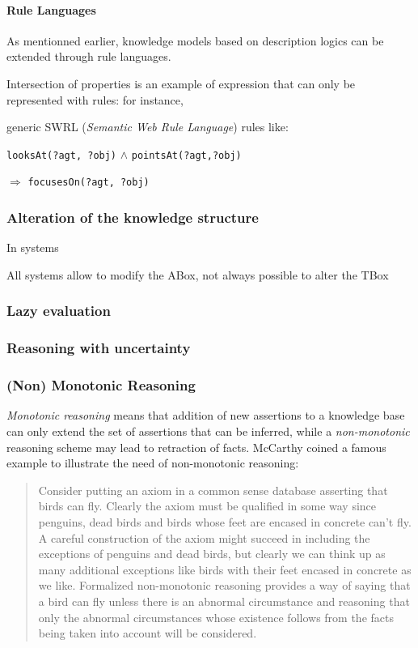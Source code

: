 \documentclass[a4paper, twocolumn]{article}
\newcommand{\concept}[1]{{\footnotesize \texttt{#1}}}
\begin{document}
\paragraph{Rule Languages}

As mentionned earlier, knowledge models based on description logics can be extended through rule languages.

Intersection of properties is an example of expression that can only be represented with rules: for instance, 

generic SWRL ({\em Semantic Web Rule Language}) rules like: \par
        \footnotesize \concept{looksAt(?agt, ?obj)} $\land$
        \concept{pointsAt(?agt,?obj)} \par $\Rightarrow$ \concept{focusesOn(?agt, ?obj)}
        \normalsize 


\subsubsection{Alteration of the knowledge structure}

In systems

All systems allow to modify the ABox, not always possible to alter the TBox


\subsubsection{Lazy evaluation}
\label{sect|lazy-evaluation}


\subsubsection{Reasoning with uncertainty}


\subsubsection{(Non) Monotonic Reasoning}

\emph{Monotonic reasoning} means that addition of new assertions to a knowledge base
can only extend the set of assertions that can be inferred, while a
\emph{non-monotonic} reasoning scheme may lead to retraction of facts.
McCarthy coined a famous example to illustrate the need of non-monotonic reasoning:

\begin{quotation}
Consider putting an axiom in a common sense database asserting that birds can
fly. Clearly the axiom must be qualified in some way since penguins, dead birds
and birds whose feet are encased in concrete can't fly. A careful construction
of the axiom might succeed in including the exceptions of penguins and dead
birds, but clearly we can think up as many additional exceptions like birds
with their feet encased in concrete as we like. Formalized non-monotonic
reasoning provides a way of saying that a bird can fly unless there
is an abnormal circumstance and reasoning that only the abnormal circumstances
whose existence follows from the facts being taken into account will be
considered.
\end{quotation}
\end{document}

